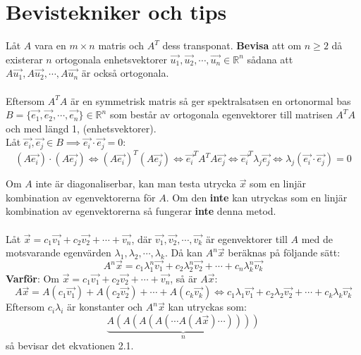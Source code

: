 \documentclass{report}
\begin{document}
\chapter{Bevistekniker och tips}
{
	Låt $A$ vara en $m \times n$ matris och $A^T$ dess transponat. \textbf{Bevisa} att om $n \geq 2$ då existerar $n$ ortogonala enhetsvektorer $\vec{u_1}, \vec{u_2}, \cdots, \vec{u_n} \in \mathbb{R}^n$ sådana att $A\vec{u_1}, A\vec{u_2}, \cdots, A\vec{u_n}$ är också ortogonala.\\\\
	
	Eftersom $A^T A$ är en symmetrisk matris så ger spektralsatsen en ortonormal bas $B = \{\vec{e_1}, \vec{e_2}, \cdots, \vec{e_n}\} \in \mathbb{R}^n$ som består av ortogonala egenvektorer till matrisen $A^T A$ och med längd 1, (enhetsvektorer).\\
	Låt $\vec{e_i}, \vec{e_j} \in B \implies \vec{e_i} \cdot \vec{e_j} = 0$:\\

\begin{equation*}
	(A\vec{e_i}) \cdot (A\vec{e_j}) \iff (A\vec{e_i})^T (A\vec{e_j}) \iff \vec{e_i}^T A^T A \vec{e_j} \iff \vec{e_i}^T \lambda_j \vec{e_j} \iff \lambda_j (\vec{e_i} \cdot \vec{e_j}) = 0
\end{equation*}
}

{
	Om $A$ inte är diagonaliserbar, kan man testa utrycka $\vec{x}$ som en linjär kombination av egenvektorerna för $A$. Om den \textbf{inte} kan utryckas som en linjär kombination av egenvektorerna så fungerar \textbf{inte} denna metod.\\\\
	Låt $\vec{x} = c_1\vec{v_1}+c_2\vec{v_2}+\cdots+\vec{v_n}$, där $\vec{v_1}, \vec{v_2}, \cdots, \vec{v_k}$ är egenvektorer till $A$ med de motsvarande egenvärden $\lambda_1, \lambda_2, \cdots, \lambda_k$. Då kan $A^n\vec{x}$ beräknas på följande sätt:
\begin{equation}
	A^n\vec{x} = c_1 \lambda_1^n \vec{v_1} + c_2 \lambda_2^n \vec{v_2} + \cdots + c_n \lambda_k^n \vec{v_k}
\end{equation}
	\textbf{Varför}: Om $\vec{x} = c_1\vec{v_1}+c_2\vec{v_2}+\cdots+\vec{v_n}$, så är $A\vec{x}$:
\begin{equation*}
	A\vec{x} = A(c_1\vec{v_1})+A(c_2\vec{v_2})+\cdots+A(c_k\vec{v_k}) \iff c_1\lambda_1\vec{v_1}+c_2\lambda_2\vec{v_2}+\cdots+c_k\lambda_k\vec{v_k}
\end{equation*}
	Eftersom $c_i\lambda_i$ är konstanter och $A^n\vec{x}$ kan utryckas som:
\begin{equation*}
	\underbrace{A(A(A(A(\cdots A(A\vec{x})\cdots))))}_{n}
\end{equation*}
	så bevisar det ekvationen 2.1.
}
\end{document}
